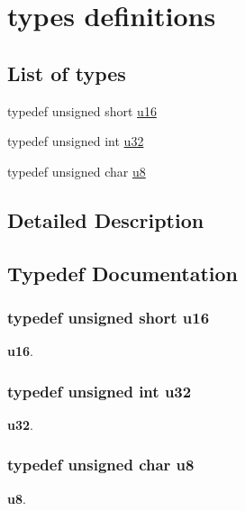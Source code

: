 \hypertarget{group___u_c_l___t_y_p_e_s}{\section{types definitions}
\label{group___u_c_l___t_y_p_e_s}
}
\subsection*{List of types}
\begin{DoxyCompactItemize}
\item 
typedef unsigned short \hyperlink{group___u_c_l___t_y_p_e_s_ga9e6c91d77e24643b888dbd1a1a590054}{u16}
\item 
typedef unsigned int \hyperlink{group___u_c_l___t_y_p_e_s_ga10e94b422ef0c20dcdec20d31a1f5049}{u32}
\item 
typedef unsigned char \hyperlink{group___u_c_l___t_y_p_e_s_gaed742c436da53c1080638ce6ef7d13de}{u8}
\end{DoxyCompactItemize}


\subsection{Detailed Description}


\subsection{Typedef Documentation}
\hypertarget{group___u_c_l___t_y_p_e_s_ga9e6c91d77e24643b888dbd1a1a590054}{
\subsubsection[{u16}]{\setlength{\rightskip}{0pt plus 5cm}typedef unsigned short {\bf u16}}}\label{group___u_c_l___t_y_p_e_s_ga9e6c91d77e24643b888dbd1a1a590054}
{\bfseries u16}. \hypertarget{group___u_c_l___t_y_p_e_s_ga10e94b422ef0c20dcdec20d31a1f5049}{
\subsubsection[{u32}]{\setlength{\rightskip}{0pt plus 5cm}typedef unsigned int {\bf u32}}}\label{group___u_c_l___t_y_p_e_s_ga10e94b422ef0c20dcdec20d31a1f5049}
{\bfseries u32}. \hypertarget{group___u_c_l___t_y_p_e_s_gaed742c436da53c1080638ce6ef7d13de}{
\subsubsection[{u8}]{\setlength{\rightskip}{0pt plus 5cm}typedef unsigned char {\bf u8}}}\label{group___u_c_l___t_y_p_e_s_gaed742c436da53c1080638ce6ef7d13de}
{\bfseries u8}. 